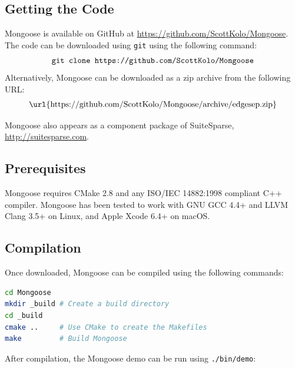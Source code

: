 \documentclass[letter]{article}
\begin{document}
\subsection{Getting the Code}
Mongoose is available on GitHub at \url{https://github.com/ScottKolo/Mongoose}. The code can be downloaded using \texttt{git} using the following command:
\[\text{\texttt{git clone https://github.com/ScottKolo/Mongoose}}\]
Alternatively, Mongoose can be downloaded as a zip archive from the following URL:
\[\text{\url{https://github.com/ScottKolo/Mongoose/archive/edgesep.zip}}\] 

Mongoose also appears as a component package of SuiteSparse, \url{http://suitesparse.com}.

\subsection{Prerequisites}
Mongoose requires CMake 2.8 and any ISO/IEC 14882:1998 compliant C++ compiler. Mongoose has been tested to work with GNU GCC 4.4+ and LLVM Clang 3.5+ on Linux, and Apple Xcode 6.4+ on macOS.

\subsection{Compilation}
Once downloaded, Mongoose can be compiled using the following commands:\\

\begin{lstlisting}[language=bash,numbers=none,xleftmargin=.2\textwidth, xrightmargin=.2\textwidth]
cd Mongoose
mkdir _build # Create a build directory
cd _build 
cmake ..     # Use CMake to create the Makefiles
make         # Build Mongoose
\end{lstlisting}

After compilation, the Mongoose demo can be run using \texttt{./bin/demo}:\\
\end{document}
